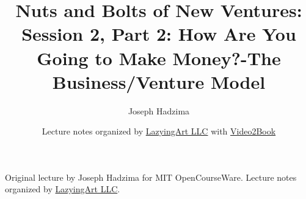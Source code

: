 \documentclass[11pt,oneside]{book}
\begin{document}
\frontmatter
\title{Nuts and Bolts of New Ventures: Session 2, Part 2: How Are You Going to Make Money?-The Business/Venture Model}
\author{Joseph Hadzima}
\date{Lecture notes organized by \href{https://lazying.art}{LazyingArt LLC} with \href{https://github.com/lachlanchen/Video2Book}{Video2Book}}
\maketitle
\begin{center}
\small Original lecture by Joseph Hadzima for MIT OpenCourseWare. Lecture notes organized by \href{https://lazying.art}{LazyingArt LLC}.
\end{center}
\clearpage
\mainmatter

\end{document}
